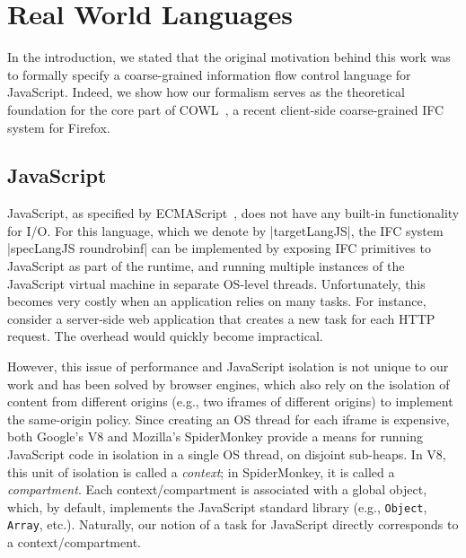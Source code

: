 \section{Real World Languages}
\label{sec:real}

In the introduction, we stated that the original motivation behind
this work was to formally specify a
coarse-grained information flow control language for JavaScript.
%
Indeed, we show how our formalism serves as the theoretical foundation for the
core part of COWL~\cite{swapi}, a recent client-side coarse-grained IFC system
for Firefox.



%


\subsection{JavaScript}
\label{sec:real:js}

JavaScript, as specified by
ECMAScript~\cite{ecma}, does not have any built-in
functionality for I/O.
%
For this language, which we denote by |targetLangJS|, the IFC system
|specLangJS roundrobinf| can be implemented by exposing IFC primitives
to JavaScript as part of the runtime, and running multiple instances
of the JavaScript virtual machine in separate OS-level threads.
%
Unfortunately, this becomes very costly when an application relies on
many tasks.
%
For instance, consider a server-side web application that
creates a new task for each HTTP request.  The overhead would
quickly become impractical.

However, this issue of performance and JavaScript isolation is not
unique to our work and has been solved by browser engines,
which also
rely on the isolation of content from
different origins (e.g., two iframes of different origins) to
implement the same-origin policy.
%
Since creating an OS thread for each iframe is expensive, both
Google's V8 and Mozilla's SpiderMonkey provide a means for running
JavaScript code in isolation in a single OS thread,
on disjoint sub-heaps.
%
In V8, this unit of isolation is called a \emph{context}; in
SpiderMonkey, it is called a \emph{compartment}.
%
Each context/compartment is associated with a global object, which, by
default, implements the JavaScript standard library (e.g.,
\verb|Object|, \verb|Array|, etc.).
%
Naturally, our notion of a task for JavaScript directly corresponds to
a context/compartment.


